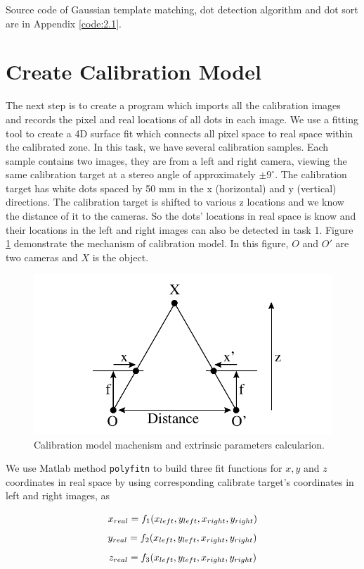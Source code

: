 Source code of Gaussian template matching, dot detection algorithm and dot sort are in Appendix \ref{code:2.1}.

\section{Create Calibration Model}

The next step is to create a program which imports all the calibration images and records the pixel and real locations of all dots in each image. We use a fitting tool to create a 4D surface fit which connects all pixel space to real space within the calibrated zone. In this task, we have several calibration samples. Each sample contains two images, they are from a left and right camera, viewing the same calibration target at a stereo angle of approximately $\pm9^{\circ}$. The calibration target has white dots spaced by 50 mm in the x (horizontal) and y (vertical) directions. The calibration target is shifted to various z locations and we know the distance of it to the cameras. So the dots' locations in real space is know and their locations in the left and right images can also be detected in task 1. Figure \ref{fig:extrinsic} demonstrate the mechanism of calibration model. In this figure, $O$ and $O'$ are two cameras and $X$ is the object.

\begin{figure}[h!]
	\centering
	\includegraphics[width=0.6\linewidth]{figures/part2/extrinsic}
	\caption{Calibration model machenism and extrinsic parameters calcularion.}
	\label{fig:extrinsic}
\end{figure}

We use Matlab method \texttt{polyfitn} to build three fit functions for $x,y$ and $z$ coordinates in real space by using corresponding calibrate target's coordinates in left and right images, as

\begin{equation*}
	\centering
	x_{real} = f_{1}(x_{left}, y_{left}, x_{right}, y_{right}) 
\end{equation*}
\begin{equation*}
	\centering
	y_{real} = f_{2}(x_{left}, y_{left}, x_{right}, y_{right}) 
\end{equation*}
\begin{equation*}
	\centering
	z_{real} = f_{3}(x_{left}, y_{left}, x_{right}, y_{right}) 
\end{equation*}

